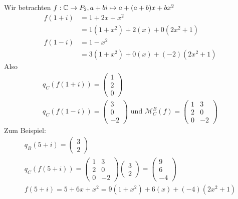 Wir betrachten $f: \mathbb{C} \rightarrow P_2, a + b i \mapsto a + (a+b)x + bx^2$
\begin{align}
f(1+i) &= 1 + 2x + x^2 \\
&= 1 (1+x^2) + 2(x) + 0(2x^2+1) \\
f(1-i) &= 1-x^2 \\
&= 3(1+x^2) + 0(x) + (-2)(2x^2 + 1)
\end{align}
Also
\begin{align}
q_C(f(1+i)) = \begin{pmatrix} 1 \\ 2 \\ 0 \end{pmatrix} \\
q_C(f(1-i)) = \begin{pmatrix} 3 \\ 0 \\ -2 \end{pmatrix} \text{ und } \mathcal{M}_{C}^{B}(f) = \begin{pmatrix} 1 & 3 \\ 2 & 0 \\ 0 & -2 \end{pmatrix}
\end{align}
Zum Beispiel:
\begin{align}
q_B(5+i) = \begin{pmatrix} 3 \\ 2 \end{pmatrix} \\
q_C(f(5+i)) = \begin{pmatrix} 1 & 3 \\ 2 & 0 \\ 0 & -2 \end{pmatrix} \begin{pmatrix} 3 \\ 2 \end{pmatrix} = \begin{pmatrix} 9 \\ 6 \\ -4 \end{pmatrix}\\
f(5+i) = 5 + 6x + x^2 = 9(1+x^2) + 6(x) + (-4)(2x^2+1)
\end{align}

